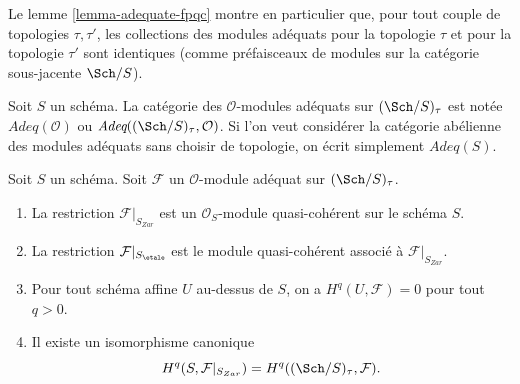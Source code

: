 \noindent
Le lemme \ref{lemma-adequate-fpqc} montre en particulier que,
pour tout couple de topologies $\tau, \tau'$, les collections
des modules adéquats pour la topologie $\tau$ et pour la topologie $\tau'$
sont identiques (comme préfaisceaux de modules sur la catégorie sous-jacente $\Sch/S$).

\begin{definition}
\label{definition-category-adequate-modules}
Soit $S$ un schéma. La catégorie des $\mathcal{O}$-modules adéquats sur
$(\Sch/S)_\tau$ est notée {\it $\textit{Adeq}(\mathcal{O})$} ou
{\it $\textit{Adeq}((\Sch/S)_\tau, \mathcal{O})$}. Si l'on veut considérer
la catégorie abélienne des modules adéquats sans choisir de
topologie, on écrit simplement {\it $\textit{Adeq}(S)$}.
\end{definition}

\begin{lemma}
\label{lemma-same-cohomology-adequate}
Soit $S$ un schéma. Soit $\mathcal{F}$ un
$\mathcal{O}$-module adéquat sur $(\Sch/S)_\tau$.
\begin{enumerate}
\item La restriction $\mathcal{F}|_{S_{Zar}}$ est un
$\mathcal{O}_S$-module quasi-cohérent sur le schéma $S$.
\item La restriction $\mathcal{F}|_{S_\etale}$ est le
module quasi-cohérent associé à $\mathcal{F}|_{S_{Zar}}$.
\item Pour tout schéma affine $U$ au-dessus de $S$, on a $H^q(U, \mathcal{F}) = 0$
pour tout $q > 0$.
\item Il existe un isomorphisme canonique
$$
H^q(S, \mathcal{F}|_{S_{Zar}}) =
H^q((\Sch/S)_\tau, \mathcal{F}).
$$
\end{enumerate}
\end{lemma}

